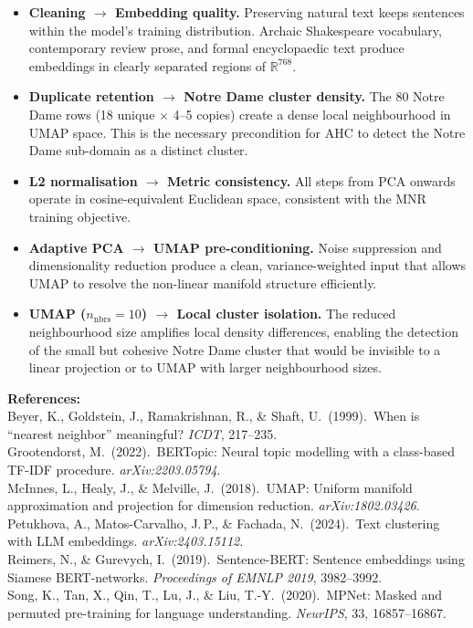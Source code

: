 \documentclass[11pt, a4paper]{article}
\begin{document}
\begin{itemize}
  \item \textbf{Cleaning $\to$ Embedding quality.}  Preserving natural text
        keeps sentences within the model's training distribution.  Archaic
        Shakespeare vocabulary, contemporary review prose, and formal
        encyclopaedic text produce embeddings in clearly separated regions
        of $\mathbb{R}^{768}$.

  \item \textbf{Duplicate retention $\to$ Notre Dame cluster density.}
        The 80 Notre Dame rows (18 unique $\times$ 4--5 copies) create a
        dense local neighbourhood in UMAP space.  This is the necessary
        precondition for AHC to detect the Notre Dame sub-domain as a
        distinct cluster.

  \item \textbf{L2 normalisation $\to$ Metric consistency.}  All steps from
        PCA onwards operate in cosine-equivalent Euclidean space, consistent
        with the MNR training objective.

  \item \textbf{Adaptive PCA $\to$ UMAP pre-conditioning.}  Noise suppression
        and dimensionality reduction produce a clean, variance-weighted input
        that allows UMAP to resolve the non-linear manifold structure
        efficiently.

  \item \textbf{UMAP ($n_{\text{nbrs}}=10$) $\to$ Local cluster isolation.}
        The reduced neighbourhood size amplifies local density differences,
        enabling the detection of the small but cohesive Notre Dame cluster
        that would be invisible to a linear projection or to UMAP with larger
        neighbourhood sizes.
\end{itemize}

\vspace{12pt}
\noindent\textcolor{midblue}{\small\textbf{References:}\\[3pt]
Beyer, K., Goldstein, J., Ramakrishnan, R., \& Shaft, U.\ (1999).\ When is
``nearest neighbor'' meaningful? \textit{ICDT}, 217--235.\\[3pt]
Grootendorst, M.\ (2022).\ BERTopic: Neural topic modelling with a class-based
TF-IDF procedure. \textit{arXiv:2203.05794}.\\[3pt]
McInnes, L., Healy, J., \& Melville, J.\ (2018).\ UMAP: Uniform manifold
approximation and projection for dimension reduction.
\textit{arXiv:1802.03426}.\\[3pt]
Petukhova, A., Matos-Carvalho, J.\,P., \& Fachada, N.\ (2024).\ Text clustering
with LLM embeddings. \textit{arXiv:2403.15112}.\\[3pt]
Reimers, N., \& Gurevych, I.\ (2019).\ Sentence-BERT: Sentence embeddings using
Siamese BERT-networks. \textit{Proceedings of EMNLP 2019}, 3982--3992.\\[3pt]
Song, K., Tan, X., Qin, T., Lu, J., \& Liu, T.-Y.\ (2020).\ MPNet: Masked and
permuted pre-training for language understanding.
\textit{NeurIPS}, 33, 16857--16867.}
\end{document}
